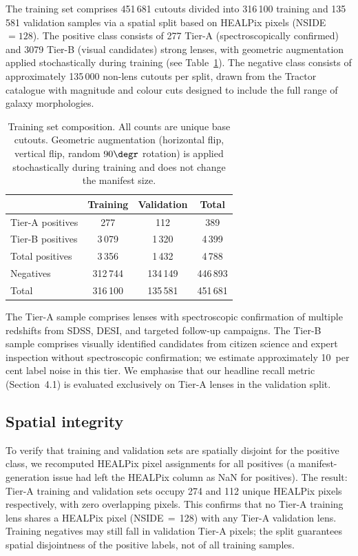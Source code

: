 \documentclass[fleqn,usenatbib]{mnras}
\begin{document}
The training set comprises 451\,681 cutouts divided into 316\,100 training and 135\,581 validation samples via a spatial split based on HEALPix pixels (NSIDE $= 128$).  The positive class consists of 277 Tier-A (spectroscopically confirmed) and 3079 Tier-B (visual candidates) strong lenses, with geometric augmentation applied stochastically during training (see Table~\ref{tab:dataset}).  The negative class consists of approximately 135\,000 non-lens cutouts per split, drawn from the Tractor catalogue with magnitude and colour cuts designed to include the full range of galaxy morphologies.

\begin{table}
\caption{Training set composition.  All counts are unique base cutouts.  Geometric augmentation (horizontal flip, vertical flip, random $90\degr$ rotation) is applied stochastically during training and does not change the manifest size.}
\label{tab:dataset}
\centering
\begin{tabular}{lccc}
\toprule
 & Training & Validation & Total \\
\midrule
Tier-A positives & 277 & 112 & 389 \\
Tier-B positives & 3\,079 & 1\,320 & 4\,399 \\
Total positives & 3\,356 & 1\,432 & 4\,788 \\
Negatives & 312\,744 & 134\,149 & 446\,893 \\
\midrule
Total & 316\,100 & 135\,581 & 451\,681 \\
\bottomrule
\end{tabular}
\end{table}

The Tier-A sample comprises lenses with spectroscopic confirmation of multiple redshifts from SDSS, DESI, and targeted follow-up campaigns.  The Tier-B sample comprises visually identified candidates from citizen science and expert inspection without spectroscopic confirmation; we estimate approximately 10~per cent label noise in this tier.  We emphasise that our headline recall metric (Section~4.1) is evaluated exclusively on Tier-A lenses in the validation split.

\subsection{Spatial integrity}

To verify that training and validation sets are spatially disjoint for the positive class, we recomputed HEALPix pixel assignments for all positives (a manifest-generation issue had left the HEALPix column as NaN for positives).  The result: Tier-A training and validation sets occupy 274 and 112 unique HEALPix pixels respectively, with zero overlapping pixels.  This confirms that no Tier-A training lens shares a HEALPix pixel (NSIDE$\,=\,$128) with any Tier-A validation lens.  Training negatives may still fall in validation Tier-A pixels; the split guarantees spatial disjointness of the positive labels, not of all training samples.
\end{document}
